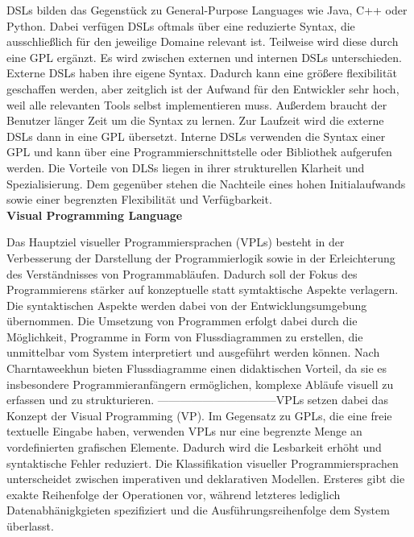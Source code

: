 \documentclass{article}
\begin{document}
    DSLs bilden das Gegenstück zu General-Purpose Languages wie Java, C++ oder Python. \cite{14}
    Dabei verfügen DSLs oftmals über eine reduzierte Syntax, die ausschließlich für den jeweilige Domaine relevant ist. Teilweise wird diese durch eine GPL ergänzt. \cite{18}
    Es wird zwischen externen und internen DSLs unterschieden. Externe DSLs haben ihre eigene Syntax. Dadurch kann eine größere flexibilität geschaffen werden, aber zeitglich ist der Aufwand für den Entwickler sehr hoch, weil alle relevanten Tools selbst implementieren muss. Außerdem braucht der Benutzer länger Zeit um die Syntax zu lernen. \cite{7}
    Zur Laufzeit wird die externe DSLs dann in eine GPL übersetzt. \cite{14}
    Interne DSLs verwenden die Syntax einer GPL und kann über eine Programmierschnittstelle oder Bibliothek aufgerufen werden. \cite{14}
    Die Vorteile von DLSs liegen in ihrer strukturellen Klarheit und Spezialisierung. Dem gegenüber stehen die Nachteile eines hohen Initialaufwands sowie einer begrenzten Flexibilität und Verfügbarkeit. \cite{18} \\ 
    \textbf{Visual Programming Language} \par
    Das Hauptziel visueller Programmiersprachen (VPLs) besteht in der Verbesserung der Darstellung der Programmierlogik sowie in der Erleichterung des Verständnisses von Programmabläufen. \cite{13}
    Dadurch soll der Fokus des Programmierens stärker auf konzeptuelle statt symtaktische Aspekte verlagern. Die syntaktischen Aspekte werden dabei von der Entwicklungsumgebung übernommen. \cite{10}
    Die Umsetzung von Programmen erfolgt dabei durch die Möglichkeit, Programme in Form von Flussdiagrammen zu erstellen, die unmittelbar vom System interpretiert und ausgeführt werden können. \cite{12}
    Nach Charntaweekhun bieten Flussdiagramme einen didaktischen Vorteil, da sie es insbesondere Programmieranfängern ermöglichen, komplexe Abläufe visuell zu erfassen und zu strukturieren. \cite{12}
    --------------------------------VPLs setzen dabei das Konzept der Visual Programming (VP). \cite{x} %
    Im Gegensatz zu GPLs, die eine freie textuelle Eingabe haben, verwenden VPLs nur eine begrenzte Menge an vordefinierten grafischen Elemente. Dadurch wird die Lesbarkeit erhöht und syntaktische Fehler reduziert.\cite{10}
    Die Klassifikation visueller Programmiersprachen unterscheidet zwischen imperativen und deklarativen Modellen. Ersteres gibt die exakte Reihenfolge der Operationen vor, während letzteres lediglich Datenabhänigkgieten spezifiziert und die Ausführungsreihenfolge dem System überlasst.\cite{21}
\end{document}
